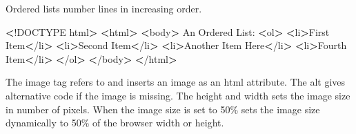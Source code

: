 \documentclass[]{book}
\newenvironment{Shaded}{\begin{snugshade}}{\end{snugshade}}
\newcommand{\StringTok}[1]{\textcolor[rgb]{0.31,0.60,0.02}{#1}}
\newcommand{\OperatorTok}[1]{\textcolor[rgb]{0.81,0.36,0.00}{\textbf{#1}}}
\newcommand{\ExtensionTok}[1]{#1}
\newcommand{\NormalTok}[1]{#1}
\begin{document}
Ordered lists number lines in increasing order.

\begin{Shaded}
\begin{Highlighting}[]
\OperatorTok{<}\NormalTok{!}\ExtensionTok{DOCTYPE}\NormalTok{ html}\OperatorTok{>}         
\OperatorTok{<}\ExtensionTok{html}\OperatorTok{>}                  
    \OperatorTok{<}\ExtensionTok{body}\OperatorTok{>}              
        \ExtensionTok{An}\NormalTok{ Ordered List:}
        \OperatorTok{<}\ExtensionTok{ol}\OperatorTok{>}                          
            \OperatorTok{<}\ExtensionTok{li}\OperatorTok{>}\NormalTok{First Item}\OperatorTok{<}\NormalTok{/li}\OperatorTok{>}       
            \OperatorTok{<}\ExtensionTok{li}\OperatorTok{>}\NormalTok{Second Item}\OperatorTok{<}\NormalTok{/li}\OperatorTok{>}      
            \OperatorTok{<}\ExtensionTok{li}\OperatorTok{>}\NormalTok{Another Item Here}\OperatorTok{<}\NormalTok{/li}\OperatorTok{>}
            \OperatorTok{<}\ExtensionTok{li}\OperatorTok{>}\NormalTok{Fourth Item}\OperatorTok{<}\NormalTok{/li}\OperatorTok{>}      
        \OperatorTok{<}\NormalTok{/}\ExtensionTok{ol}\OperatorTok{>}                         
    \OperatorTok{<}\NormalTok{/}\ExtensionTok{body}\OperatorTok{>}             
\OperatorTok{<}\NormalTok{/}\ExtensionTok{html}\OperatorTok{>}                 
\end{Highlighting}
\end{Shaded}

The image tag refers to and inserts an image as an html attribute. The
alt gives alternative code if the image is missing. The height and width
sets the image size in number of pixels. When the image size is set to
50\% sets the image size dynamically to 50\% of the browser width or
height.

\begin{Shaded}
\end{Shaded}
\end{document}
